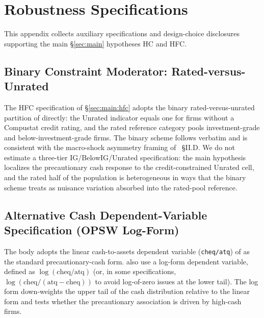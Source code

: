 
\section{Robustness Specifications}
\label{app:robustness}

This appendix collects auxiliary specifications and design-choice disclosures supporting the main \S\ref{sec:main} hypotheses HC and HFC.

\subsection{Binary Constraint Moderator: Rated-versus-Unrated}
\label{app:robustness:rated}

The HFC specification of \S\ref{sec:main:hfc} adopts the binary rated-versus-unrated partition of  directly: the Unrated indicator equals one for firms without a Compustat credit rating, and the rated reference category pools investment-grade and below-investment-grade firms. The binary scheme follows \citeauthor{faulkender2006} verbatim and is consistent with the macro-shock asymmetry framing of ~\S II.D. We do not estimate a three-tier IG/BelowIG/Unrated specification: the main hypothesis localizes the precautionary cash response to the credit-constrained Unrated cell, and the rated half of the population is heterogeneous in ways that the binary scheme treats as nuisance variation absorbed into the rated-pool reference.

\subsection{Alternative Cash Dependent-Variable Specification (OPSW Log-Form)}
\label{app:robustness:opsw}

The body adopts the linear cash-to-assets dependent variable (\texttt{cheq/atq}) of  as the standard precautionary-cash form.  also use a log-form dependent variable, defined as $\log(\text{cheq}/\text{atq})$ (or, in some specifications, $\log(\text{cheq}/(\text{atq}-\text{cheq}))$ to avoid log-of-zero issues at the lower tail). The log form down-weights the upper tail of the cash distribution relative to the linear form and tests whether the precautionary association is driven by high-cash firms.

